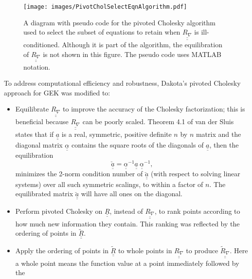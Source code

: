 \begin{figure}[p]
\centerline{\texttt{[image: images/PivotCholSelectEqnAlgorithm.pdf]}}
\caption{A diagram with pseudo code for the pivoted Cholesky algorithm used to select the subset of equations to retain when $\underline{\underline{R_{\nabla}}}$ is ill-conditioned. Although it is part of the algorithm, the equilibration of $\underline{\underline{R_{\nabla}}}$ is not shown in this figure.  The pseudo code uses MATLAB notation.}
\label{fig:SubsetSelectAlgorithm}
\end{figure}

To address computational efficiency and robustness, Dakota's pivoted
Cholesky approach for GEK was modified to: 
\begin{itemize}
\item Equilibrate $\underline{\underline{R_{\nabla}}}$ to improve 
      the accuracy of the Cholesky factorization; this is beneficial
      because $\underline{\underline{R_{\nabla}}}$ can be poorly 
      scaled. Theorem 4.1 of 
      van der Sluis \cite{Van69} states that if
      $\underline{\underline{a}}$ is a real, symmetric, positive 
      definite $n$ by $n$ matrix and the diagonal matrix 
      $\underline{\underline{\alpha}}$ contains the square roots of the 
      diagonals of $\underline{\underline{a}}$, then the equilibration
      \begin{displaymath}
        \underline{\underline{\breve{a}}}=\underline{\underline{\alpha}}^{-1}\underline{\underline{a}}\ \underline{\underline{\alpha}}^{-1},
      \end{displaymath}
      minimizes the 2-norm condition number of 
      $\underline{\underline{\breve{a}}}$ (with respect to solving linear 
      systems) over all such symmetric scalings, to within a factor of $n$.
      The equilibrated matrix $\underline{\underline{\breve{a}}}$ will 
      have all ones on the diagonal.
\item Perform pivoted Cholesky on $\underline{\underline{R}}$,
      instead of $\underline{\underline{R_{\nabla}}}$, to rank points 
      according to how much new information they contain.  This 
      ranking was reflected by the ordering of points in 
      $\underline{\underline{\tilde{R}}}$.
\item Apply the ordering of points in $\underline{\underline{\tilde{R}}}$
      to whole points in $\underline{\underline{R_{\nabla}}}$ to produce
      $\underline{\underline{\tilde{R}_{\nabla}}}$.  Here a whole point
      means the function value at a point immediately followed by the 

\end{itemize}
